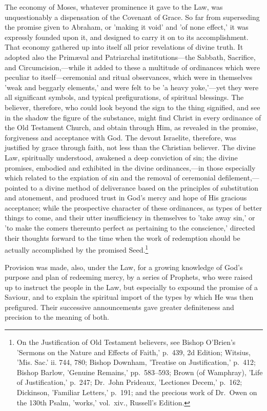 \documentclass[
]{book}
\begin{document}
The economy of Moses, whatever prominence it gave to the Law, was unquestionably a dispensation of the Covenant of Grace. So far from superseding the promise given to Abraham, or 'making it void' and 'of none effect,' it was expressly founded upon it, and designed to carry it on to its accomplishment. That economy gathered up into itself all prior revelations of divine truth. It adopted also the Primæval and Patriarchal institutions---the Sabbath, Sacrifice, and Circumcision,---while it added to these a multitude of ordinances which were peculiar to itself---ceremonial and ritual observances, which were in themselves 'weak and beggarly elements,' and were felt to be 'a heavy yoke,'---yet they were all significant symbols, and typical prefigurations, of spiritual blessings. The believer, therefore, who could look beyond the sign to the thing signified, and see in the shadow the figure of the substance, might find Christ in every ordinance of the Old Testament Church, and obtain through Him, as revealed in the promise, forgiveness and acceptance with God. The devout Israelite, therefore, was justified by grace through faith, not less than the Christian believer. The divine Law, spiritually understood, awakened a deep conviction of sin; the divine promises, embodied and exhibited in the divine ordinances,---in those especially which related to the expiation of sin and the removal of ceremonial defilement,---pointed to a divine method of deliverance based on the principles of substitution and atonement, and produced trust in God's mercy and hope of His gracious acceptance; while the prospective character of these ordinances, as types of better things to come, and their utter insufficiency in themselves to 'take away sin,' or 'to make the comers thereunto perfect as pertaining to the conscience,' directed their thoughts forward to the time when the work of redemption should be actually accomplished by the promised Seed.\footnote{On the Justification of Old Testament believers, see Bishop O'Brien's 'Sermons on the Nature and Effects of Faith,' p.~439, 2d Edition; Witsius, 'Mis. Sac.' ii. 744, 780; Bishop Downham, 'Treatise on Justification,' p.~412; Bishop Barlow, 'Genuine Remains,' pp.~583--593; Brown (of Wamphray), 'Life of Justification,' p.~247; Dr.~John Prideaux, 'Lectiones Decem,' p.~162; Dickinson, 'Familiar Letters,' p.~191; and the precious work of Dr.~Owen on the 130th Psalm, 'works,' vol.~xiv., Russell's Edition.}

Provision was made, also, under the Law, for a growing knowledge of God's purpose and plan of redeeming mercy, by a series of Prophets, who were raised up to instruct the people in the Law, but especially to expound the promise of a Saviour, and to explain the spiritual import of the types by which He was then prefigured. Their successive announcements gave greater definiteness and precision to the meaning of both.
\end{document}
